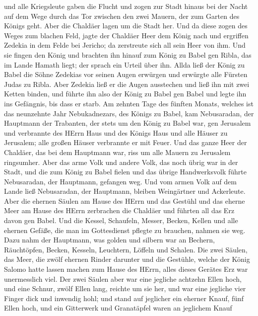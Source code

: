 und alle Kriegsleute gaben die Flucht und zogen zur Stadt hinaus bei der
Nacht auf dem Wege durch das Tor zwischen den zwei Mauern, der zum
Garten des Königs geht. Aber die Chaldäer lagen um die Stadt her.
 Und da diese zogen des Weges zum blachen Feld, jagte der
Chaldäer Heer dem König nach und ergriffen Zedekia in dem Felde bei
Jericho; da zerstreute sich all sein Heer von ihm.  Und sie
fingen den König und brachten ihn hinauf zum König zu Babel gen Ribla,
das im Lande Hamath liegt; der sprach ein Urteil über ihn. 
Allda ließ der König zu Babel die Söhne Zedekias vor seinen Augen
erwürgen und erwürgte alle Fürsten Judas zu Ribla.  Aber
Zedekia ließ er die Augen ausstechen und ließ ihn mit zwei Ketten
binden, und führte ihn also der König zu Babel gen Babel und legte ihn
ins Gefängnis, bis dass er starb.  Am zehnten Tage des
fünften Monats, welches ist das neunzehnte Jahr Nebukadnezars, des
Königs zu Babel, kam Nebusaradan, der Hauptmann der Trabanten, der stets
um den König zu Babel war, gen Jerusalem  und verbrannte
des HErrn Haus und des Königs Haus und alle Häuser zu Jerusalem; alle
großen Häuser verbrannte er mit Feuer.  Und das ganze Heer
der Chaldäer, das bei dem Hauptmann war, riss um alle Mauern zu
Jerusalem ringsumher.  Aber das arme Volk und andere Volk,
das noch übrig war in der Stadt, und die zum König zu Babel fielen und
das übrige Handwerksvolk führte Nebusaradan, der Hauptmann, gefangen
weg.  Und vom armen Volk auf dem Lande ließ Nebusaradan,
der Hauptmann, bleiben Weingärtner und Ackerleute.  Aber
die ehernen Säulen am Hause des HErrn und das Gestühl und das eherne
Meer am Hause des HErrn zerbrachen die Chaldäer und führten all das Erz
davon gen Babel.  Und die Kessel, Schaufeln, Messer,
Becken, Kellen und alle ehernen Gefäße, die man im Gottesdienst pflegte
zu brauchen, nahmen sie weg.  Dazu nahm der Hauptmann, was
golden und silbern war an Bechern, Räuchtöpfen, Becken, Kesseln,
Leuchtern, Löffeln und Schalen.  Die zwei Säulen, das Meer,
die zwölf ehernen Rinder darunter und die Gestühle, welche der König
Salomo hatte lassen machen zum Hause des HErrn, alles dieses Gerätes Erz
war unermesslich viel.  Der zwei Säulen aber war eine
jegliche achtzehn Ellen hoch, und eine Schnur, zwölf Ellen lang, reichte
um sie her, und war eine jegliche vier Finger dick und inwendig hohl;
 und stand auf jeglicher ein eherner Knauf, fünf Ellen
hoch, und ein Gitterwerk und Granatäpfel waren an jeglichem Knauf
